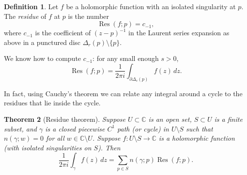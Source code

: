 \documentclass[12pt,openany]{book}
\newcommand{\C}{{\mathbb{C}}}
\newcommand{\myindex}[1]{#1\index{#1}}
\theoremstyle{plain}
\newtheorem{thm}{Theorem}[section]
\theoremstyle{remark}
\theoremstyle{definition}
\newtheorem{defn}[thm]{Definition}
\theoremstyle{exercise}
\theoremstyle{example}
\begin{document}
\begin{defn}
Let $f$ be a holomorphic function
with an isolated singularity at $p$.
The \emph{\myindex{residue}} of $f$ at $p$ is the number
\begin{equation*}
\operatorname{Res}(f;p) = c_{-1} ,
\end{equation*}
where $c_{-1}$ is the coefficient of ${(z-p)}^{-1}$ in the Laurent series
expansion as above in a punctured disc $\Delta_r(p) \setminus \{ p \}$.
\end{defn}

We know how to compute $c_{-1}$: for any small enough $s > 0$,
\begin{equation*}
\operatorname{Res}(f;p) 
=
\frac{1}{2\pi i} \int_{\partial \Delta_{s}(p)} f(z) \, dz .
\end{equation*}

In fact, using Cauchy's theorem we can relate any integral around
a cycle to the residues that lie inside the cycle.

\begin{thm}[Residue theorem]\label{thm:residue}
Suppose $U \subset \C$ is an open set, $S \subset U$ is a finite subset,
and $\gamma$ is a closed piecewise $C^1$ path (or cycle) in $U \setminus S$
such that $n(\gamma;w) = 0$ for all $w \in \C \setminus U$.
Suppose $f \colon U \setminus S \to \C$ is a holomorphic function (with isolated
singularities on $S$).
Then
\begin{equation*}
\frac{1}{2\pi i} \int_{\gamma} f(z) \, dz = \sum_{p \in S} n(\gamma;p) \operatorname{Res}(f;p) .
\end{equation*}
\end{thm}
\end{document}

